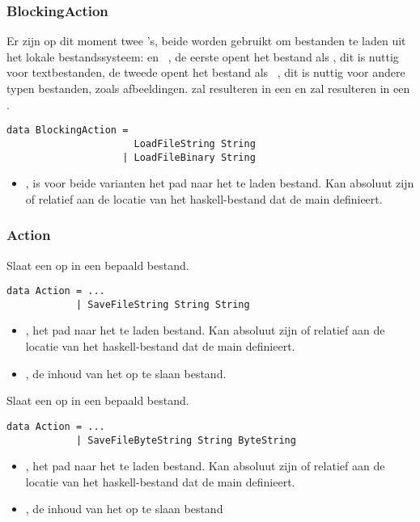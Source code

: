 \subsubsection{BlockingAction}
Er zijn op dit moment twee 's, beide worden gebruikt om bestanden te laden uit het lokale bestandssysteem:  en ~, de eerste opent het bestand als , dit is nuttig voor textbestanden, de tweede opent het bestand als ~, dit is nuttig voor andere typen bestanden, zoals afbeeldingen.  zal resulteren in een  en  zal resulteren in een .
\begin{lstlisting}
data BlockingAction = 
					  LoadFileString String
					| LoadFileBinary String
\end{lstlisting}
\begin{itemize}
	\item {}, is voor beide varianten het pad naar het te laden bestand. Kan absoluut zijn of relatief aan de locatie van het haskell-bestand dat de main definieert.
\end{itemize}

\subsubsection{Action}
Slaat een  op in een bepaald bestand.
\begin{lstlisting}
data Action = ...
			| SaveFileString String String
\end{lstlisting}
\begin{itemize}
	\item {}, het pad naar het te laden bestand. Kan absoluut zijn of relatief aan de locatie van het haskell-bestand dat de main definieert.
	\item {}, de inhoud van het op te slaan bestand.
\end{itemize}

Slaat een  op in een bepaald bestand.
\begin{lstlisting}
data Action = ...
			| SaveFileByteString String ByteString
\end{lstlisting}
\begin{itemize}
	\item {}, het pad naar het te laden bestand. Kan absoluut zijn of relatief aan de locatie van het haskell-bestand dat de main definieert.
	\item {}, de inhoud van het op te slaan bestand
\end{itemize}

